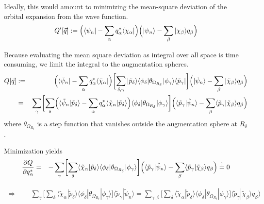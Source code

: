 \documentclass[11pt,a4paper]{report}
\begin{document}
Ideally, this would amount to minimizing the mean-square deviation of
the orbital expansion from the wave function.
\begin{eqnarray*}
Q'[\vec{q}]:=\Bigl(\langle\psi_n|-\sum_\alpha q^*_\alpha\langle\chi_\alpha|\Bigr)
\Bigl(|\psi_n\rangle-\sum_\beta |\chi_\beta\rangle q_\beta\Bigr)
\end{eqnarray*}

Because evaluating the mean square deviation as integral over all
space is time consuming, we limit the integral to the augmentation
spheres.
\begin{eqnarray}
Q[\vec{q}]&:=&
\Bigl(\langle\tilde{\psi}_n|
-\sum_\alpha q^*_\alpha\langle\tilde{\chi}_\alpha|\Bigr)
\biggl[\sum_{\delta,\gamma}|\tilde{p}_\delta\rangle\langle\phi_\delta|
\theta_{\Omega_{R_\delta}}|\phi_\gamma\rangle\langle\tilde{p}_\gamma|\biggr]
\Bigl(|\tilde{\psi}_n\rangle
-\sum_\beta |\tilde{\chi}_\beta\rangle q_\beta\Bigr)
\nonumber\\
&=&
\sum_{\gamma}
\biggl[
\sum_{\delta}
\Bigl(\langle\tilde{\psi}_n|\tilde{p}_\delta\rangle
-\sum_\alpha q^*_\alpha\langle\tilde{\chi}_\alpha|\tilde{p}_\delta\rangle\Bigr)
\langle\phi_\delta|\theta_{\Omega_{R_\delta}}|\phi_\gamma\rangle
\biggr]
\Bigl(\langle\tilde{p}_\gamma|\tilde{\psi}_n\rangle
-\sum_\beta \langle\tilde{p}_\gamma|\tilde{\chi}_\beta\rangle q_\beta\Bigr)
\end{eqnarray}
where $\theta_{\Omega_{R_\delta}}$ is a step function that vanishes
outside the augmentation sphere at $R_\delta$.

Minimization yields
\begin{eqnarray}
\frac{\partial Q}{\partial q^*_\alpha}
&=&
-\sum_{\gamma}
\biggl[
\sum_{\delta}
\langle\tilde{\chi}_\alpha|\tilde{p}_\delta\rangle
\langle\phi_\delta|\theta_{\Omega_{R_\delta}}|\phi_\gamma\rangle
\biggr]
\Bigl(\langle\tilde{p}_\gamma|\tilde{\psi}_n\rangle
-\sum_\beta \langle\tilde{p}_\gamma|\tilde{\chi}_\beta\rangle q_\beta\Bigr)
\stackrel{!}{=}0
\nonumber
\end{eqnarray}


\begin{eqnarray}
\Rightarrow\qquad\sum_{\gamma}
\biggl[
\sum_{\delta}
\langle\tilde{\chi}_\alpha|\tilde{p}_\delta\rangle
\langle\phi_\delta|\theta_{\Omega_{R_\delta}}|\phi_\gamma\rangle
\biggr]
\langle\tilde{p}_\gamma|\tilde{\psi}_n\rangle
=
\sum_{\gamma,\beta}
\biggl[
\sum_{\delta}
\langle\tilde{\chi}_\alpha|\tilde{p}_\delta\rangle
\langle\phi_\delta|\theta_{\Omega_{R_\delta}}|\phi_\gamma\rangle
\biggr]
\langle\tilde{p}_\gamma|\tilde{\chi}_\beta\rangle q_\beta\Bigr)
\nonumber
\end{eqnarray}
\end{document}
